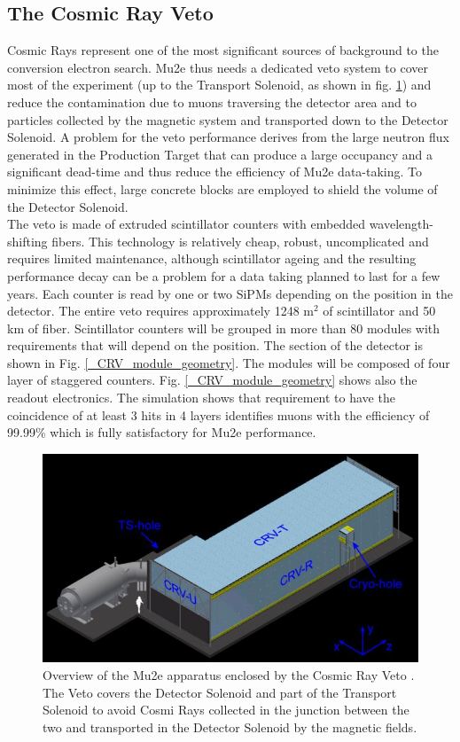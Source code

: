 \documentclass[12pt,a4paper,openright, oneside, titlepage]{book} %
\begin{document}
\subsection{The Cosmic Ray Veto}
Cosmic Rays represent one of the most significant sources of background to the conversion electron search.
Mu2e thus needs a dedicated veto system \cite{CRV:2019} to cover most of the experiment 
(up to the Transport Solenoid, as shown in fig. \ref{_CRV}) and reduce the contamination due to muons traversing the detector area 
and to particles collected by the magnetic system and transported down to the Detector Solenoid. 
A problem for the veto performance derives from the large neutron flux generated 
in the Production Target that can produce a large occupancy and a significant dead-time and thus reduce the efficiency
of Mu2e data-taking. To minimize this effect, large concrete blocks are employed to shield the volume of the Detector Solenoid.\\
The veto is made of extruded scintillator counters with embedded wavelength-shifting fibers.
This technology is relatively cheap, robust, uncomplicated and requires limited maintenance, 
although scintillator ageing and the resulting performance decay can be a problem for a
data taking planned to last for a few years.
Each counter is read by one or two SiPMs depending on the position in the detector. 
The entire veto requires approximately 1248 m$^2$ of scintillator and 50 km of fiber. 
Scintillator counters will be grouped in more than 80 modules with requirements that will depend on the position.
The section of the detector is shown in Fig. \ref{_CRV_module_geometry}.
The modules will be composed of four layer of staggered counters. 
Fig. \ref{_CRV_module_geometry} shows also the readout electronics. 
The simulation shows that requirement to have the coincidence of at least 3 hits in 4 layers
identifies muons with the efficiency of 99.99\% which is fully satisfactory for Mu2e performance.


\begin{figure}[h!]
\centering
\includegraphics[scale=2]{CRV}
\caption{Overview of the Mu2e apparatus enclosed by the 
Cosmic Ray Veto \cite{CRV:2019}. 
The Veto covers the Detector Solenoid and part of the 
Transport Solenoid to avoid Cosmi Rays collected in the junction 
between the two and transported in the Detector Solenoid by the magnetic fields.}
\label{_CRV}
\end{figure}
\end{document}
